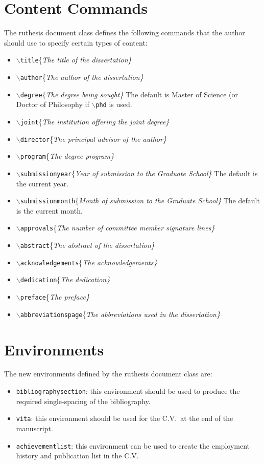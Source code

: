 \section{Content Commands}
The ruthesis document class defines the following commands that the author should use to specify certain types of content:
\begin{itemize}
\item $\backslash$\texttt{title}\{{\it{The title of the dissertation}\}}
\item $\backslash$\texttt{author}\{{\it{The author of the dissertation}\}}
\item $\backslash$\texttt{degree}\{{\it{The degree being sought}\}}
      The default is Master of Science (or Doctor of Philosophy if $\backslash$\texttt{phd} is used.
\item $\backslash$\texttt{joint}\{{\it{The institution offering the joint degree}\}}
\item $\backslash$\texttt{director}\{{\it{The principal advisor of the author}\}}
\item $\backslash$\texttt{program}\{{\it{The degree program}\}}
\item $\backslash$\texttt{submissionyear}\{{\it{Year of submission to the Graduate School}\}}
      The default is the current year.
\item $\backslash$\texttt{submissionmonth}\{{\it{Month of submission to the Graduate School}\}}
      The default is the current month.
\item $\backslash$\texttt{approvals}\{{\it{The number of committee member signature lines}\}}
\item $\backslash$\texttt{abstract}\{{\it{The abstract of the dissertation}\}}
\item $\backslash$\texttt{acknowledgements}\{{\it{The acknowledgements}\}}
\item $\backslash$\texttt{dedication}\{{\it{The dedication}\}}
\item $\backslash$\texttt{preface}\{{\it{The preface}\}}
\item $\backslash$\texttt{abbreviationspage}\{{\it{The abbreviations used in the dissertation}\}}
\end{itemize}

\section{Environments}
The new environments defined by the ruthesis document class are:
\begin{itemize}
\item \texttt{bibliographysection}: this environment should be used to produce the required single-spacing of the bibliography.
\item \texttt{vita}: this environment should be used for the C.V.\ at the end of the manuscript.
\item \texttt{achievementlist}: this environment can be used to create the employment history and publication list in the C.V.
\end{itemize}

